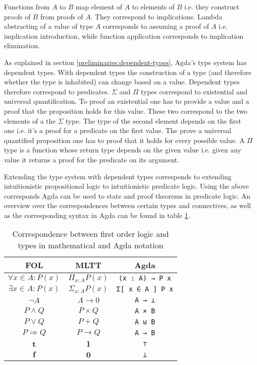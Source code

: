Functions from $A$ to $B$ map element of $A$ to elements of $B$ i.e. they
construct proofs of $B$ from proofs of $A$.
They correspond to implications.
Lambda abstracting of a value of type $A$ corresponds to assuming a proof of $A$
i.e. implication introduction, while function application corresponds to
implication elimination.

As explained in section \ref{preliminaries:dependent-types}, Agda's type system
has dependent types.
With dependent types the construction of a type (and therefore whether the type
is inhabited) can change based on a value.
Dependent types therefore correspond to predicates.
$\Sigma$ and $\Pi$ types correspond to existential and universal quantification.
To proof an existential one has to provide a value and a proof that the
proposition holds for this value.
These two correspond to the two elements of a the $\Sigma$ type.
The type of the second element depends on the first one i.e. it's a proof for a
predicate on the first value.
The prove a universal quantified proposition one has to proof that it holds for
every possible value.
A $\Pi$ type is a function whose return type depends on the given value i.e.
given any value it returns a proof for the predicate on its argument.

Extending the type system with dependent types corresponds to extending
intuitionistic propositional logic to intuitionistic predicate logic.
Using the above corresponds Agda can be used to state and proof theorems in
predicate logic.
An overview over the correspondences between certain types and connectives, as
well as the corresponding syntax in Agda can be found in table
\ref{preliminaries:propositions-as-types:table}.

\begin{table}
  \begin{center}
    \begin{tabular}{ccc}
      FOL & MLTT & Agda \\\hline
      $\forall x \in A: P(x)$ & $\Pi_{x:A}P(x)$ & \texttt{(x : A) → P x} \\
      $\exists x \in A: P(x)$ & $\Sigma_{x:A} P(x)$ & \texttt{Σ[ x ∈ A ] P x} \\
      $\neg A$ & $A \rightarrow 0$ & \texttt{A → ⊥} \\
      $P \wedge Q$ & $P \times Q$ & \texttt{A × B} \\
      $P \vee Q$ & $P + Q$ & \texttt{A ⊎ B} \\
      $P \Rightarrow Q$ & $P \rightarrow Q$ & \texttt{A → B} \\
      $\mathbf t$ & $\mathbf 1$ & \texttt{⊤} \\
      $\mathbf f$ & $\mathbf 0$ & \texttt{⊥}
    \end{tabular}
  \end{center}
  \label{preliminaries:propositions-as-types:table}
  \caption{Correspondence between first order logic and types in mathematical
    and Agda notation}
\end{table}

